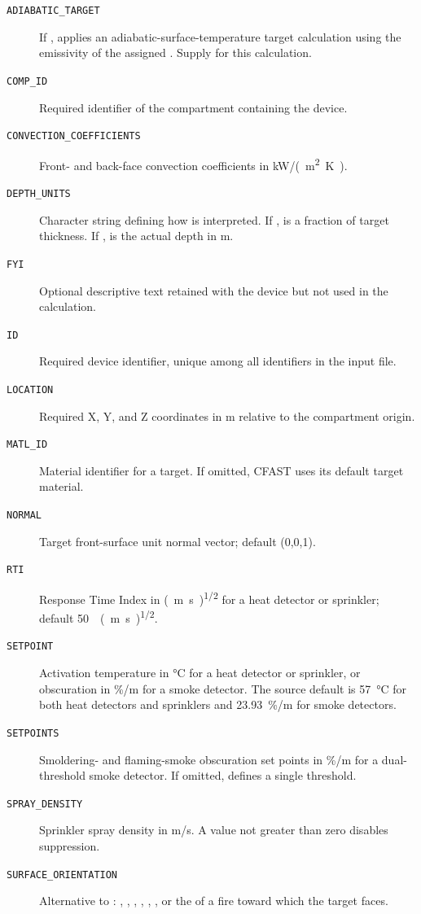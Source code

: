 {{\begin{description}
    \item[\texttt{ADIABATIC\_TARGET}] If , applies an adiabatic-surface-temperature target calculation using the emissivity of the assigned . Supply  for this calculation.
    \item[\texttt{COMP\_ID}] Required identifier of the compartment containing the device.
    \item[\texttt{CONVECTION\_COEFFICIENTS}] Front- and back-face convection coefficients in \unit{kW/(m^2 K)}.
    \item[\texttt{DEPTH\_UNITS}] Character string defining how  is interpreted. If ,  is a fraction of target thickness. If ,  is the actual depth in \unit{m}.
    \item[\texttt{FYI}] Optional descriptive text retained with the device but not used in the calculation.
    \item[\texttt{ID}] Required device identifier, unique among all  identifiers in the input file.
    \item[\texttt{LOCATION}] Required X, Y, and Z coordinates in \unit{m} relative to the compartment origin.
    \item[\texttt{MATL\_ID}] Material identifier for a target. If omitted, CFAST uses its default target material.
    \item[\texttt{NORMAL}] Target front-surface unit normal vector; default (0,0,1).
    \item[\texttt{RTI}] Response Time Index in \unit{(m.s)\tothe{1/2}} for a heat detector or sprinkler; default 50~~\unit{(m.s)\tothe{1/2}}.
    \item[\texttt{SETPOINT}] Activation temperature in \unit{\degreeCelsius} for a heat detector or sprinkler, or obscuration in \unit{\%/m} for a smoke detector. The source default is 57~\unit{\degreeCelsius} for both heat detectors and sprinklers and 23.93~\%/m for smoke detectors.
    \item[\texttt{SETPOINTS}] Smoldering- and flaming-smoke obscuration set points in \%/m for a dual-threshold smoke detector. If omitted,  defines a single threshold.
    \item[\texttt{SPRAY\_DENSITY}] Sprinkler spray density in \unit{m/s}. A value not greater than zero disables suppression.
    \item[\texttt{SURFACE\_ORIENTATION}] Alternative to : , , , , , , or the  of a fire toward which the target faces.

\end{description}}}
